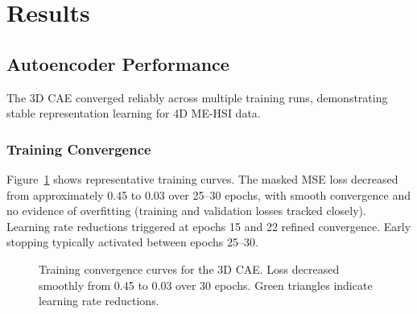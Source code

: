 \section{Results}
\label{sec:results}
\subsection{Autoencoder Performance}
\label{sec:results_autoencoder}

The 3D CAE converged reliably across multiple training runs, demonstrating stable representation learning for 4D ME-HSI data.

\subsubsection{Training Convergence}
Figure~\ref{fig:training} shows representative training curves.
The masked MSE loss decreased from approximately 0.45 to 0.03 over 25--30 epochs, with smooth convergence and no evidence of overfitting (training and validation losses tracked closely).
Learning rate reductions triggered at epochs 15 and 22 refined convergence.
Early stopping typically activated between epochs 25--30.

\begin{figure}[!t]
\centering
{}
\caption{Training convergence curves for the 3D CAE. Loss decreased smoothly from 0.45 to 0.03 over 30 epochs. Green triangles indicate learning rate reductions.}
\label{fig:training}
\end{figure}


